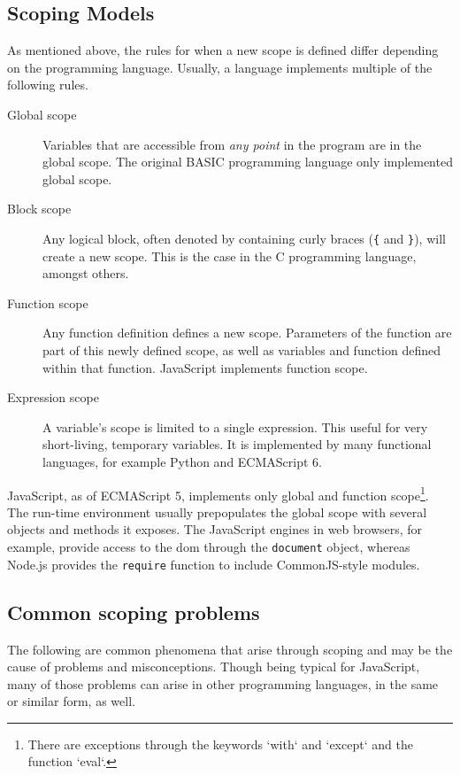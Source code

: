 \subsection{Scoping Models}\label{scoping-models}

As mentioned above, the rules for when a new scope is defined differ
depending on the programming language. Usually, a language implements
multiple of the following rules.

\begin{description}
\item[Global scope]
Variables that are accessible from \emph{any point} in the program are
in the global scope. The original BASIC programming language only
implemented global scope.
\item[Block scope]
Any logical block, often denoted by containing curly braces (\texttt{\{}
and \texttt{\}}), will create a new scope. This is the case in the C
programming language, amongst others.
\item[Function scope]
Any function definition defines a new scope. Parameters of the function
are part of this newly defined scope, as well as variables and function
defined within that function. JavaScript implements function scope.
\item[Expression scope]
A variable’s scope is limited to a single expression. This useful for
very short-living, temporary variables. It is implemented by many
functional languages, for example Python and ECMAScript 6.
\end{description}

JavaScript, as of ECMAScript 5, implements only global and function
scope\footnote{There are exceptions through the keywords `with` and `except` and the function `eval`.}.
The run-time environment usually prepopulates the global scope with
several objects and methods it exposes. The JavaScript engines in web
browsers, for example, provide access to the \ac{dom} through the
\texttt{document} object, whereas Node.js provides the \texttt{require}
function to include CommonJS-style modules.

\subsection{Common scoping problems}\label{common-scoping-problems}

The following are common phenomena that arise through scoping and may be
the cause of problems and misconceptions. Though being typical for
JavaScript, many of those problems can arise in other programming
languages, in the same or similar form, as well.

